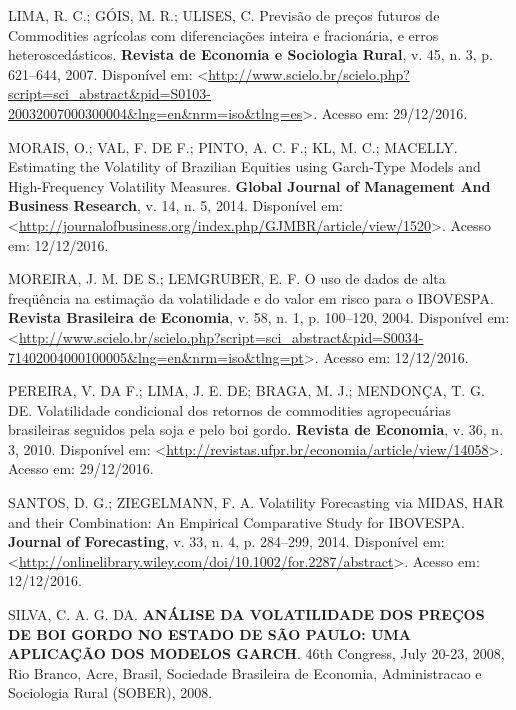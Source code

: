 \documentclass[]{article}
\begin{document}
\hypertarget{ref-lima_previsao_2007}{}
LIMA, R. C.; GÓIS, M. R.; ULISES, C. Previsão de preços futuros de
Commodities agrícolas com diferenciações inteira e fracionária, e erros
heteroscedásticos. \textbf{Revista de Economia e Sociologia Rural}, v.
45, n. 3, p. 621--644, 2007. Disponível em:
\textless{}\url{http://www.scielo.br/scielo.php?script=sci_abstract\&pid=S0103-20032007000300004\&lng=en\&nrm=iso\&tlng=es}\textgreater{}.
Acesso em: 29/12/2016.

\hypertarget{ref-morais_estimating_2014}{}
MORAIS, O.; VAL, F. DE F.; PINTO, A. C. F.; KL, M. C.; MACELLY.
Estimating the Volatility of Brazilian Equities using Garch-Type Models
and High-Frequency Volatility Measures. \textbf{Global Journal of
Management And Business Research}, v. 14, n. 5, 2014. Disponível em:
\textless{}\url{http://journalofbusiness.org/index.php/GJMBR/article/view/1520}\textgreater{}.
Acesso em: 12/12/2016.

\hypertarget{ref-moreira_o_2004}{}
MOREIRA, J. M. DE S.; LEMGRUBER, E. F. O uso de dados de alta freqüência
na estimação da volatilidade e do valor em risco para o IBOVESPA.
\textbf{Revista Brasileira de Economia}, v. 58, n. 1, p. 100--120, 2004.
Disponível em:
\textless{}\url{http://www.scielo.br/scielo.php?script=sci_abstract\&pid=S0034-71402004000100005\&lng=en\&nrm=iso\&tlng=pt}\textgreater{}.
Acesso em: 12/12/2016.

\hypertarget{ref-pereira_volatilidade_2010}{}
PEREIRA, V. DA F.; LIMA, J. E. DE; BRAGA, M. J.; MENDONÇA, T. G. DE.
Volatilidade condicional dos retornos de commodities agropecuárias
brasileiras seguidos pela soja e pelo boi gordo. \textbf{Revista de
Economia}, v. 36, n. 3, 2010. Disponível em:
\textless{}\url{http://revistas.ufpr.br/economia/article/view/14058}\textgreater{}.
Acesso em: 29/12/2016.

\hypertarget{ref-santos_volatility_2014}{}
SANTOS, D. G.; ZIEGELMANN, F. A. Volatility Forecasting via MIDAS, HAR
and their Combination: An Empirical Comparative Study for IBOVESPA.
\textbf{Journal of Forecasting}, v. 33, n. 4, p. 284--299, 2014.
Disponível em:
\textless{}\url{http://onlinelibrary.wiley.com/doi/10.1002/for.2287/abstract}\textgreater{}.
Acesso em: 12/12/2016.

\hypertarget{ref-silva_alise_2008}{}
SILVA, C. A. G. DA. \textbf{ANÁLISE DA VOLATILIDADE DOS PREÇOS DE BOI
GORDO NO ESTADO DE SÃO PAULO: UMA APLICAÇÃO DOS MODELOS GARCH}. 46th
Congress, July 20-23, 2008, Rio Branco, Acre, Brasil, Sociedade
Brasileira de Economia, Administracao e Sociologia Rural (SOBER), 2008.
\end{document}
